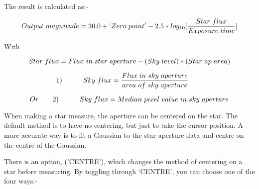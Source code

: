 \begin{small}
{{   The result is calculated as:-

   $$ Output{\hspace{0.3em}}magnitude = 30.0 + `Zero{\hspace{0.3em}}point'
      - 2.5*log_{10}[\frac{Star{\hspace{0.3em}}flux}{Exposure{
      \hspace{0.3em}}time}] $$

 With

$$ Star{\hspace{0.3em}}flux =
   Flux{\hspace{0.3em}}in{\hspace{0.3em}}star{\hspace{0.3em}}aperture -
   (Sky{\hspace{0.3em}}level)*(Star{\hspace{0.3em}}ap{\hspace{0.3em}}area) $$

$$ {\hspace*{-2em}}
   1) {\hspace*{3em}}   Sky{\hspace{0.3em}}flux  =
     \frac{Flux{\hspace{0.3em}}in{\hspace{0.3em}}sky{
     \hspace{0.3em}}aperture}{area{\hspace{0.3em}}of{\hspace{0.3em}}sky{
     \hspace{0.3em}}aperture} $$

$$   Or {\hspace*{2em}}   2) {\hspace*{3em}} Sky{\hspace{0.3em}}flux  =
     Median{\hspace{0.3em}}pixel{\hspace{0.3em}}value{\hspace{0.3em}}in{
     \hspace{0.3em}}sky{\hspace{0.3em}}aperture  $$

   When making a star measure, the aperture can be centered on the star.
   The default method is to have no centering, but just to take the
   cursor position. A more accurate way is to fit a Gaussian to the
   star aperture data and centre on the centre of the Gaussian.

   There is an option, ('CENTRE'), which changes the method of
   centering on a star before measuring. By toggling through `CENTRE',
   you can choose one of the four ways:-

}}
\end{small}
